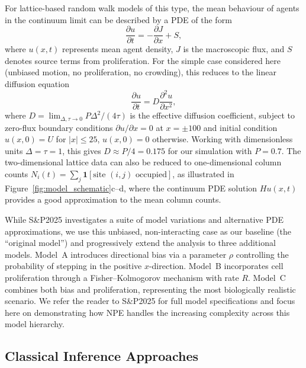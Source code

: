 \documentclass{article}
\newcommand{\SP}{S\&P2025}
\begin{document}
For lattice-based random walk models of this type, the mean behaviour of agents in the continuum limit can be described by a PDE of the form \citep{Codling2008,Simpson2025.05.25.656057,Plank2025}
\begin{equation}
	\frac{\partial u}{\partial t} = -\frac{\partial J}{\partial x} + S,
\end{equation}
where $u(x,t)$ represents mean agent density, $J$ is the macroscopic flux, and $S$ denotes source terms from proliferation. For the simple case considered here (unbiased motion, no proliferation, no crowding), this reduces to the linear diffusion equation
\begin{equation}
	\frac{\partial u}{\partial t} = D\frac{\partial^2 u}{\partial x^2},
\end{equation}
where $D = \lim_{\Delta,\tau \to 0} P\Delta^2/(4\tau)$ is the effective diffusion coefficient, subject to zero-flux boundary conditions $\partial u/\partial x = 0$ at $x = \pm 100$ and initial condition $u(x,0) = U$ for $|x| \leq 25$, $u(x,0) = 0$ otherwise. Working with dimensionless units $\Delta=\tau=1$, this gives $D \approx P/4=0.175$ for our simulation with $P=0.7$. The two-dimensional lattice data can also be reduced to one-dimensional column counts $N_i(t) = \sum_{j} \mathbf{1}[\text{site } (i,j) \text{ occupied}]$, as illustrated in Figure~\ref{fig:model_schematic}c--d, where the continuum PDE solution $Hu(x,t)$ provides a good approximation to the mean column counts.

While \SP{} investigates a suite of model variations and alternative PDE approximations, we use this unbiased, non-interacting case as our baseline (the ``original model'') and progressively extend the analysis to three additional models. Model~A introduces directional bias via a parameter $\rho$ controlling the probability of stepping in the positive $x$-direction. Model~B incorporates cell proliferation through a Fisher--Kolmogorov mechanism with rate $R$. Model~C combines both bias and proliferation, representing the most biologically realistic scenario. We refer the reader to \SP{} for full model specifications and focus here on demonstrating how NPE handles the increasing complexity across this model hierarchy.



\subsection{Classical Inference Approaches}\label{sec:classical_inference}
\end{document}
